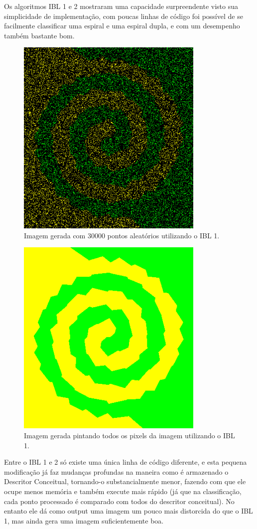 \documentclass[12pt]{article}
\begin{document}
Os algoritmos IBL 1 e 2 mostraram uma capacidade surpreendente visto sua simplicidade de implementação, com poucas linhas de código foi possível de se facilmente classificar uma espiral e uma espiral dupla, e com um desempenho também bastante bom.
\begin{figure}[hb]
	\center
	\includegraphics[width=9cm]{./outputs/double30000dots.png}
	\caption{Imagem gerada com 30000 pontos aleatórios utilizando o IBL 1.}
\end{figure}
\begin{figure}[hb]
	\center
	\includegraphics[width=9cm]{./outputs/sequentialdouble.png}
	\caption{Imagem gerada pintando todos os pixels da imagem utilizando o IBL 1.}
\end{figure}
Entre o IBL 1 e 2 só existe uma única linha de código diferente, e esta pequena modificação já faz mudanças profundas na maneira como é armazenado o Descritor Conceitual, tornando-o substancialmente menor, fazendo com que ele ocupe menos memória e também execute mais rápido (já que na classificação, cada ponto processado é comparado com todos do descritor conceitual). No entanto ele dá como output uma imagem um pouco mais distorcida do que o IBL 1, mas ainda gera uma imagem suficientemente boa.
\end{document}
